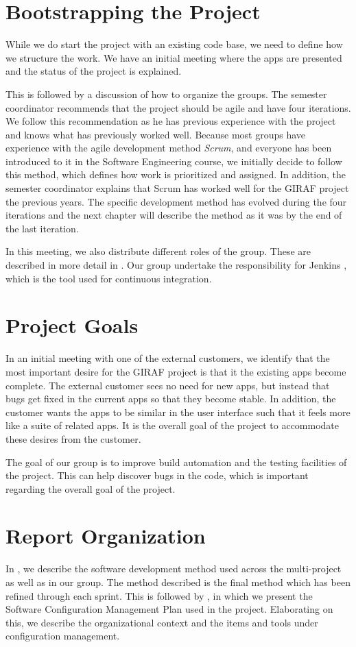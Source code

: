 \section{Bootstrapping the Project}
While we do start the project with an existing code base, we need to define how we structure the work. We have an initial meeting where the apps are presented and the status of the project is explained.

This is followed by a discussion of how to organize the groups. The semester coordinator recommends that the project should be agile and have four iterations. We follow this recommendation as he has previous experience with the project and knows what has previously worked well. Because most groups have experience with the agile development method \emph{Scrum}, and everyone has been introduced to it in the Software Engineering course, we initially decide to follow this method, which defines how work is prioritized and assigned. In addition, the semester coordinator explains that Scrum has worked well for the GIRAF project the previous years. The specific development method has evolved during the four iterations and the next chapter will describe the method as it was by the end of the last iteration.

In this meeting, we also distribute different roles of the group. These are described in more detail in . Our group undertake the responsibility for Jenkins \cite{JenkinsWebsite}, which is the tool used for continuous integration.

\section{Project Goals}
In an initial meeting with one of the external customers, we identify that the most important desire for the GIRAF project is that it the existing apps become complete. The external customer sees no need for new apps, but instead that bugs get fixed in the current apps so that they become stable. In addition, the customer wants the apps to be similar in the user interface such that it feels more like a suite of related apps. It is the overall goal of the project to accommodate these desires from the customer.

The goal of our group is to improve build automation and the testing facilities of the project. This can help discover bugs in the code, which is important regarding the overall goal of the project.

\section{Report Organization}
In , we describe the software development method used across the multi-project as well as in our group. The method described is the final method which has been refined through each sprint. This is followed by , in which we present the Software Configuration Management Plan used in the project. Elaborating on this, we describe the organizational context and the items and tools under configuration management.

